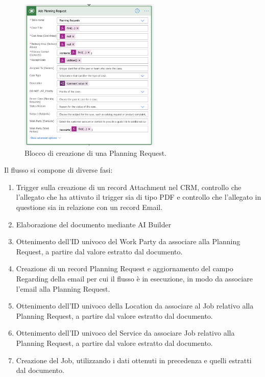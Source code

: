 \begin{figure}[ht]
  \centering
  \includegraphics[width=0.6\textwidth]{planning-request-block.png}
  \caption{Blocco di creazione di una Planning Request.}
  \label{fig:bloccoPlanningRequest}
\end{figure}
Il flusso si compone di diverse fasi:
\begin{enumerate}
  \item Trigger sulla creazione di un record Attachment nel CRM, controllo che l'allegato che ha attivato il trigger sia di tipo PDF e controllo che l'allegato in questione sia in relazione con un record Email.
  \item Elaborazione del documento mediante AI Builder
  \item Ottenimento dell'ID univoco del Work Party da associare alla Planning Request, a partire dal valore estratto dal documento.
  \item Creazione di un record Planning Request e aggiornamento del campo Regarding della email per cui il flusso è in esecuzione, in modo da associare l'email alla Planning Request.
  \item Ottenimento dell'ID univoco della Location da associare al Job relativo alla Planning Request, a partire dal valore estratto dal documento.
  \item Ottenimento dell'ID univoco del Service da associare Job relativo alla Planning Request, a partire dal valore estratto dal documento.
  \item Creazione del Job, utilizzando i dati ottenuti in precedenza e quelli estratti dal documento.
\end{enumerate}


